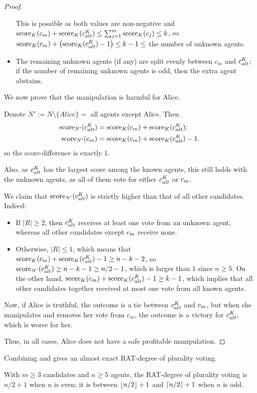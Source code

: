 \begin{proof}
\begin{itemize}
This is possible as both values are non-negative and $\operatorname{score}_K(c_m) + \operatorname{score}_K(c^K_{alt}) \leq \sum_{j =1}^m \operatorname{score}_K(c_j) \leq  k$, so $\operatorname{score}_K(c_m) + \left(\operatorname{score}_K(c^K_{alt})-1\right) \leq k-1\leq $ the number of unknown agents.
\item 
The remaining unknown agents (if any) are split evenly between $c_m$ and $c^K_{alt}$; if the number of remaining unknown agents is odd, then the extra agent abstains. %
\end{itemize}
We now prove that the manipulation is harmful for Alice.

Denote $N' := N\setminus \{Alice\} = $ all agents except Alice. Then
\begin{align*}
\operatorname{score}_{N'}(c^K_{alt}) &= \operatorname{score}_K(c_m) + \operatorname{score}_K(c^K_{alt});
\\
\operatorname{score}_{N'}(c_m) &= \operatorname{score}_K(c_m) + \operatorname{score}_K(c^K_{alt}) - 1.
\end{align*}
so the score-difference is exactly $1$.

Also, as $c^K_{alt}$ has the largest score among the known agents, this still holds with the unknown agents, as all of them vote for either $c^K_{alt}$ or $c_m$.

We claim that $\operatorname{score}_{N'}(c^K_{alt})$ is strictly higher than that of all other candidates. Indeed:
\begin{itemize}
\item If $|R|\geq 2$, then $c^K_{alt}$ receives at least one vote from an unknown agent, whereas all other candidates except $c_m$ receive none.

\item Otherwise, $|R|\leq 1$, which means that $\operatorname{score}_K(c_m) + \operatorname{score}_K(c^K_{alt}) - 1 \geq n-k-2$, so
$\operatorname{score}_{N'}(c^K_{alt}) \geq n-k-1\geq n/2-1$, which is larger than $1$ since $n\geq 5$. 
On the other hand, 
$\operatorname{score}_K(c_m) + \operatorname{score}_K(c^K_{alt}) - 1 \geq k-1$, which  implies that all other candidates together received at most one vote from all known agents.
\end{itemize}
Now, if Alice is truthful, the outcome is a tie between $c^K_{alt}$ and $c_m$, but when she manipulates and removes her vote from $c_m$, the outcome is a victory for $c^K_{alt}$, which is worse for her.

Thus, in all cases, Alice does not have a safe profitable manipulation.
\end{proof}

Combining  and 
 gives an almost exact RAT-degree of plurality voting.
\begin{theorem}
With $m\geq 3$ candidates and $n\geq 5$ agents, the RAT-degree of plurality voting is $n/2+1$ when $n$ is even;
it is between $\left\lfloor n/2 \right\rfloor+1$ and  $\left\lceil n/2 \right\rceil+1$ when $n$ is odd.
\end{theorem}


